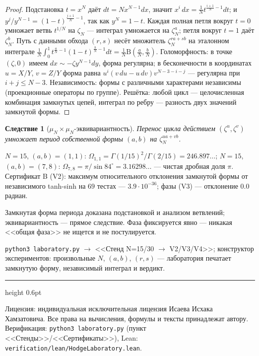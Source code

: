 \documentclass[11pt,a4paper]{article}
\theoremstyle{plain}
\newtheorem{corollary}[theorem]{Следствие}
\theoremstyle{definition}
\theoremstyle{remark}
\newcommand{\Ga}{\Gamma}
\newcommand{\Bfun}{\mathrm{B}}
\begin{document}
\begin{proof}
Подстановка $t=x^N$ даёт $dt=Nx^{N-1}dx$, значит
$x^i\,dx=\tfrac1Nt^{\frac{i+1}N-1}dt$; и
$y^j/y^{N-1}=(1-t)^{\frac{j+1}N-1}$, так как $y^N=1-t$. Каждая
полная петля вокруг $t=0$ умножает ветвь $t^{1/N}$ на $\zeta_N$ ---
интеграл умножается на $\zeta_N^a$; петля вокруг $t=1$ даёт
$\zeta_N^b$. Путь с данными обхода $(r,s)$ несёт множитель
$\zeta_N^{ra+sb}$ на эталонном интеграле
$\frac1N\int_0^1t^{\frac aN-1}(1-t)^{\frac bN-1}dt
=\frac1N\Bfun(\frac aN,\frac bN)$. Голоморфность: в точке
$(\zeta,0)$ имеем $dx\sim-\zeta y^{N-1}dy$, форма регулярна; в
бесконечности в координатах $u=X/Y$, $v=Z/Y$ форма равна
$u^i(v\,du-u\,dv)v^{N-3-i-j}$ --- регулярна при $i+j\le N-3$.
Независимость: формы с различными характерами независимы
(проекционные операторы по группе). Решётка: любой цикл ---
целочисленная комбинация замкнутых цепей, интеграл по ребру ---
разность двух значений замкнутой формы.
\end{proof}

\begin{corollary}[$\mu_N\times\mu_N$-эквивариантность]
Перенос цикла действием $(\zeta^u,\zeta^v)$ умножает период
собственной формы $(a,b)$ на $\zeta_N^{ua+vb}$.
\end{corollary}

\begin{databox}[числа]
$N=15$, $(a,b)=(1,1)$: $\Omega_{1,1}=\Ga(1/15)^2/\Ga(2/15)
=246.897\ldots$; $N=15$, $(a,b)=(7,8)$: $\Omega_{7,8}
=\pi/\sin84^\circ=3.16298\ldots$ --- чистая дробная доля $\pi$.
Сертификат B (V2): максимум относительного отклонения замкнутой
формы от независимого tanh-sinh на $69$ тестах ---
$3.9\cdot10^{-36}$; фазы (V3) --- отклонение $0.0$ радиан.
\end{databox}

\begin{statusbox}[итог]
Замкнутая форма периода доказана подстановкой и анализом ветвлений;
эквивариантность --- прямое следствие. Фаза фиксируется явно ---
никакая <<общая фаза>> не ищется и не постулируется.
\end{statusbox}

\begin{verifybox}
\texttt{python3 laboratory.py} $\to$ <<Стенд N=15/30 $\to$
V2/V3/V4>>; конструктор экспериментов: произвольные $N$, $(a,b)$,
$(r,s)$ --- лаборатория печатает замкнутую форму, независимый
интеграл и вердикт.
\end{verifybox}

\vfill
{\color{linkblue}\hrule height 0.6pt}
\vspace{0.5em}
{\small\color{gray}
Лицензия: индивидуальная исключительная лицензия Исаева Исхака Хамзатовича.
Все права на вычисления, формулы и тексты принадлежат автору.
Верификация: \texttt{python3 laboratory.py} (пункт <<Стенды>>/<<Сертификаты>>),
Lean: \texttt{verification/lean/HodgeLaboratory.lean}.
}
\end{document}
